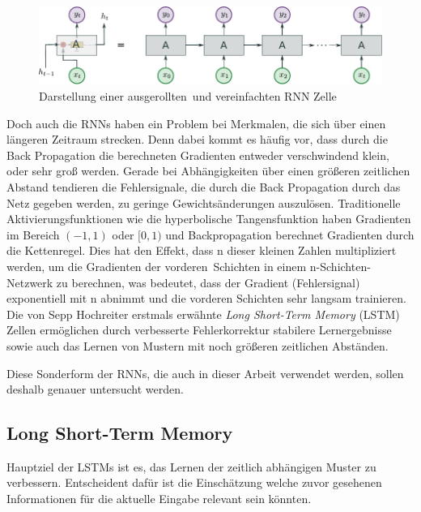                 \begin{figure}[h]
                    \centering
                    \includegraphics[width=1\textwidth]{images/Illustrationen/RNN_enrolled}
                    \caption{Darstellung einer \glqq ausgerollten\grqq \ und vereinfachten RNN Zelle}
                    \label{fig:RNN_enroled}
                \end{figure}
            Doch auch die RNNs haben ein Problem bei Merkmalen, die sich über einen längeren Zeitraum strecken.
            Denn dabei kommt es häufig vor, dass durch die Back Propagation die berechneten Gradienten entweder verschwindend klein, oder sehr groß werden.
            Gerade bei Abhängigkeiten über einen größeren zeitlichen Abstand tendieren die Fehlersignale,
            die durch die Back Propagation durch das Netz gegeben werden, zu geringe Gewichtsänderungen auszulösen.
            Traditionelle Aktivierungsfunktionen wie die hyperbolische Tangensfunktion haben Gradienten im Bereich $(-1,1)$ oder $[0,1)$ und Backpropagation berechnet Gradienten durch die Kettenregel.
            Dies hat den Effekt, dass n dieser kleinen Zahlen multipliziert werden, um die Gradienten der \glqq vorderen\grqq \ Schichten in einem n-Schichten-Netzwerk zu berechnen, was bedeutet, dass der Gradient (Fehlersignal) exponentiell mit n abnimmt und die vorderen Schichten sehr langsam trainieren.
            Die von Sepp Hochreiter erstmals erwähnte \textit{Long Short-Term Memory} (LSTM) Zellen ermöglichen durch verbesserte Fehlerkorrektur stabilere Lernergebnisse sowie auch das Lernen von Mustern mit noch größeren zeitlichen Abständen.~\cite{HOCHREITER1998}

            Diese Sonderform der RNNs, die auch in dieser Arbeit verwendet werden, sollen deshalb genauer untersucht werden.
   	
        \subsection{Long Short-Term Memory} 
            Hauptziel der LSTMs ist es, das Lernen der zeitlich abhängigen Muster zu verbessern.
            Entscheident dafür ist die Einschätzung welche zuvor gesehenen Informationen für die aktuelle Eingabe relevant sein könnten.
            
